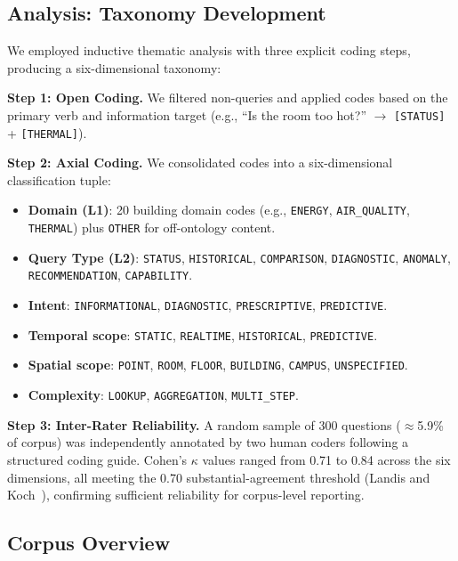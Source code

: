 \documentclass[acmsmall]{acmart}
\begin{document}
\subsection{Analysis: Taxonomy Development}
\label{sec:taxonomy}

We employed inductive thematic analysis with three explicit coding steps, producing a six-di\-men\-sion\-al taxonomy:

\textbf{Step 1: Open Coding.} We filtered non-queries and applied codes based on the primary verb and information target (e.g., ``Is the room too hot?'' $\rightarrow$ \texttt{[STATUS]} + \texttt{[THERMAL]}).

\textbf{Step 2: Axial Coding.} We consolidated codes into a six-dimensional classification tuple:
\begin{itemize}
    \item \textbf{Domain (L1)}: 20 building domain codes (e.g., \texttt{ENERGY}, \texttt{AIR\_QUALITY}, \texttt{THERMAL}) plus \texttt{OTHER} for off-ontology content.
    \item \textbf{Query Type (L2)}: \texttt{STATUS}, \texttt{HISTORICAL}, \texttt{COMPARISON}, \texttt{DIAGNOSTIC}, \texttt{ANOMALY}, \texttt{RECOMMENDATION}, \texttt{CAPABILITY}.
    \item \textbf{Intent}: \texttt{INFORMATIONAL}, \texttt{DIAGNOSTIC}, \texttt{PRESCRIPTIVE}, \texttt{PREDICTIVE}.
    \item \textbf{Temporal scope}: \texttt{STATIC}, \texttt{REALTIME}, \texttt{HISTORICAL}, \texttt{PREDICTIVE}.
    \item \textbf{Spatial scope}: \texttt{POINT}, \texttt{ROOM}, \texttt{FLOOR}, \texttt{BUILDING}, \texttt{CAMPUS}, \texttt{UNSPECIFIED}.
    \item \textbf{Complexity}: \texttt{LOOKUP}, \texttt{AGGREGATION}, \texttt{MULTI\_STEP}.
\end{itemize}

\textbf{Step 3: Inter-Rater Reliability.} A random sample of 300 questions ($\approx$5.9\% of corpus) was independently annotated by two human coders following a structured coding guide. Cohen's $\kappa$ values ranged from 0.71 to 0.84 across the six dimensions, all meeting the 0.70 substantial-agreement threshold (Landis and Koch~\cite{galanos2023}), confirming sufficient reliability for corpus-level reporting.

\subsection{Corpus Overview}
\label{sec:corpus}
\end{document}
